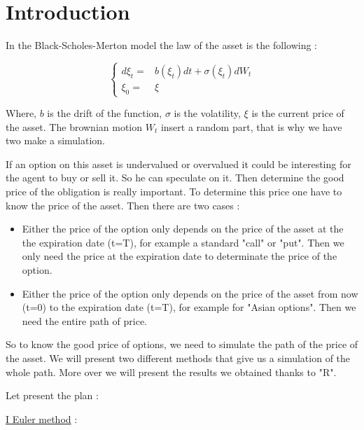 
\section{Introduction}
\label{sec:introduction}
In the Black-Scholes-Merton model the law of the asset is the following : 

\[
\label{starteq}
\begin{cases}
d\xi_{t}= & b(\xi_{t})dt+\sigma(\xi_{t})dW_{t}\\
\xi_{0}= & \xi
\end{cases}
\]

Where, $b$ is the drift of the function, $\sigma$ is the volatility, $\xi$ is the current price of the asset.
\newline
The brownian motion $W_{t}$ insert a random part, that is why we have two make a simulation.

If an option on this asset is undervalued or overvalued it could be interesting for the agent to buy or sell it. So he can speculate on it. Then determine the good price of the obligation is really important. To determine this price one have to know the price of the asset.
\newline 
\newline 
Then there are two cases :
\newline
\begin{itemize}
\item Either the price of the option only depends on the price of the asset at the the expiration date (t=T), for example a standard "call" or "put". Then we only need the price at the expiration date to determinate the price of the option.
\newline
\item Either the price of the option only depends on the price of the asset from now (t=0) to the expiration date (t=T), for example for "Asian options". Then we need the entire path of price.
\end{itemize}


\vspace{1em}
So to know the good price of options, we need to simulate the path of the price of the asset. We will present two different methods that give us a simulation of the whole path. More over we will present the results we obtained thanks to "R".

Let present the plan :

\vspace{2em}

\underline{I Euler method} : 


